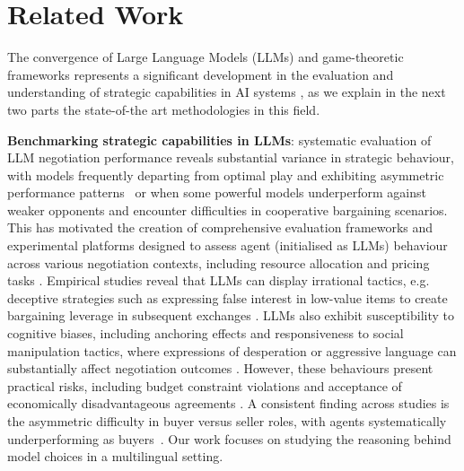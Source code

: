 \documentclass[11pt]{article}
\begin{document}
\section{Related Work}

The convergence of Large Language Models (LLMs) and game-theoretic frameworks represents a significant development in the evaluation and understanding of strategic capabilities in AI systems \cite{sun2025gametheorymeetslarge}, as we explain in the next two parts the state-of-the art methodologies in this field.

\textbf{Benchmarking strategic capabilities in LLMs}: systematic evaluation of LLM negotiation performance reveals substantial variance in strategic behaviour, with models frequently departing from optimal play and exhibiting asymmetric performance patterns~\cite{DBLP:conf/iclr/DavidsonVK024, DBLP:journals/corr/abs-2411-05990,DBLP:journals/corr/abs-2305-16867} or when some powerful models underperform against weaker opponents and encounter difficulties in cooperative bargaining scenarios. This has motivated the creation of comprehensive evaluation frameworks and experimental platforms designed to assess agent (initialised as LLMs) behaviour across various negotiation contexts, including resource allocation and pricing tasks \cite{DBLP:conf/icml/0001CYTJ024, DBLP:conf/acl/Xia0RMZ0024}.
Empirical studies reveal that LLMs can display irrational tactics, e.g. deceptive strategies such as expressing false interest in low-value items to create bargaining leverage in subsequent exchanges \cite{lewis-etal-2017-deal}. LLMs also exhibit susceptibility to cognitive biases, including anchoring effects and responsiveness to social manipulation tactics, where expressions of desperation or aggressive language can substantially affect negotiation outcomes \cite{DBLP:conf/icml/0001CYTJ024}. However, these behaviours present practical risks, including budget constraint violations and acceptance of economically disadvantageous agreements \cite{DBLP:journals/corr/abs-2506-00073}. A consistent finding across studies is the asymmetric difficulty in buyer versus seller roles, with agents systematically underperforming as buyers~\cite{DBLP:conf/acl/Xia0RMZ0024}. Our work focuses on studying the reasoning behind model choices in a multilingual setting.
\end{document}
